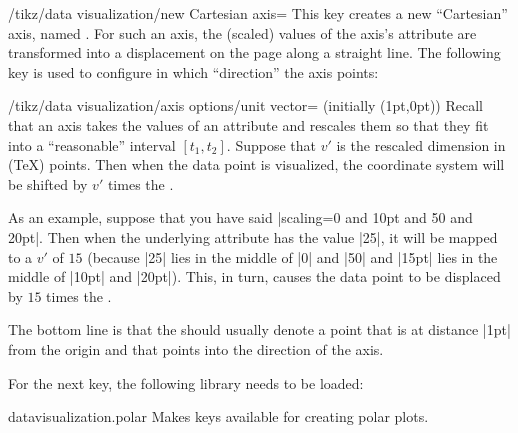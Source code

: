 \begin{key}{/tikz/data visualization/new Cartesian axis=}
  This key creates a new ``Cartesian'' axis, named . For
  such an axis, the (scaled) values of the axis's attribute are
  transformed into a displacement on the page along a straight
  line. The following key is used to configure in which ``direction''
  the axis points:
  \begin{key}{/tikz/data visualization/axis options/unit
      vector= (initially {(1pt,0pt)})}
    Recall that an axis takes the values of an attribute and rescales
    them so that they fit into a ``reasonable'' interval
    $[t_1,t_2]$. Suppose that $v'$ is the rescaled dimension in (\TeX)
    points. Then when the data point is visualized, the coordinate
    system will be shifted by $v'$ times the .

    As an example, suppose that you have said
    |scaling=0 and 10pt and 50 and 20pt|. Then when the underlying
    attribute has the value |25|, it will be mapped to a $v'$ of $15$
    (because |25| lies in the middle of |0| and |50| and |15pt| lies
    in the middle of |10pt| and |20pt|). This, in turn, causes the
    data point to be displaced by $15$ times the .

    The bottom line is that the  should usually
    denote a point that is at distance |1pt| from the origin and that
    points into the direction of the axis.
\begin{codeexample}[]
\end{codeexample}
\end{key}
\end{key}


For the next key, the following library needs to be loaded:

\begin{tikzlibrary}{datavisualization.polar}
  Makes keys available for creating polar plots.
\end{tikzlibrary}

